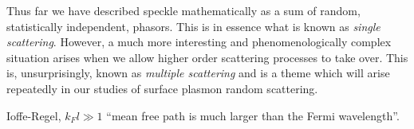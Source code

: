 Thus far we have described speckle mathematically as a sum of random,
statistically independent, phasors.  This is in essence what is known as
\textit{single scattering}.  However, a much more interesting and
phenomenologically complex situation arises when we allow higher order
scattering processes to take over.  This is, unsurprisingly, known as
\textit{multiple scattering} and is a theme which will arise repeatedly in
our studies of surface plasmon random scattering.

Ioffe-Regel, $k_F l \gg 1$ ``mean free path is much larger than the Fermi
wavelength''.
